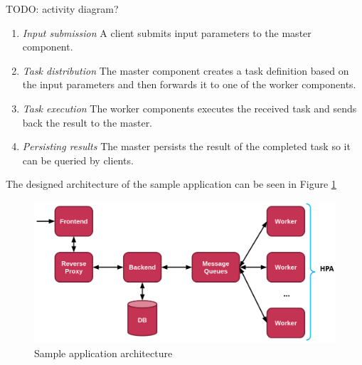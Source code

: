 TODO: activity diagram?

\begin{enumerate}
	\item \emph{Input submission} A client submits input parameters to the master component.
	\item \emph{Task distribution} The master component creates a task definition based on the input parameters and then forwards it to one of the worker components.
	\item \emph{Task execution} The worker components executes the received task and sends back the result to the master.
	\item \emph{Persisting results} The master persists the result of the completed task so it can be queried by clients.
\end{enumerate}

The designed architecture of the sample application can be seen in Figure \ref{fig:sample_app_arch}

\begin{figure}[h]
	\centering
	\includegraphics[width=130mm, keepaspectratio]{figures/sample_app_arch.png}
	\caption{Sample application architecture}
	\label{fig:sample_app_arch}
\end{figure}
%
%


